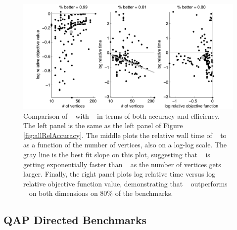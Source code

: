 \documentclass[preprint,11pt]{elsarticle}
\begin{document}
\begin{figure}[htbp]
	\centering
		\includegraphics[width=1.0\linewidth]{allPathCompare.pdf}
	\caption{Comparison of \FAQ~ with \Path~ in terms of both accuracy and efficiency.  The left panel is the same as the left panel of Figure \ref{fig:allRelAccuracy}.  The middle plots the relative wall time of \FAQ~ to \Path~ as a function of the number of vertices, also on a log-log scale.  The gray line is the best fit slope on this plot, suggesting that \FAQ~ is getting exponentially faster than \Path~ as the number of vertices gets larger.  Finally, the right panel plots log relative time versus log relative objective function value, demonstrating that \FAQ~ outperforms \Path~ on both dimensions on $80\%$ of the benchmarks.}
	\label{fig:tradeoff}
\end{figure}





\subsection{QAP Directed Benchmarks}
\label{sub:directed}
\end{document}
